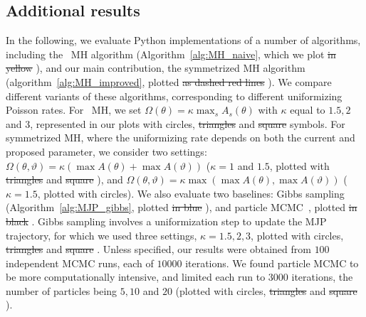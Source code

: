 \subsection{Additional results}
In the following, we evaluate Python implementations of a number of algorithms, including the \naive\ MH algorithm (Algorithm~\ref{alg:MH_naive}, which we plot \sout{in yellow} ), and our main contribution, the symmetrized MH algorithm (algorithm~\ref{alg:MH_improved}, plotted \sout{as dashed red lines}
). 
We compare different variants of these algorithms, corresponding to different uniformizing Poisson rates. %
For \naive\ MH, we set $\Omega(\theta) = \kappa \max_s A_s(\theta) $ with $\kappa$  equal to $1.5, 2$ and $3$, represented in our plots with circles, \sout{triangles}  and \sout{square}  symbols. 
For symmetrized MH, where the uniformizing rate depends on both the current and proposed parameter, we consider two settings:
 $\Omega(\theta, \vartheta) = \kappa (\max A(\theta) + \max A(\vartheta))$ 
 ($\kappa = 1$ and $1.5$, plotted with \sout{triangles}  and \sout{square} ), and 
$\Omega(\theta, \vartheta) = \kappa \max(\max A(\theta), \max A(\vartheta))$
($\kappa=1.5$, plotted with {circles}).  
We also evaluate two baselines: Gibbs sampling (Algorithm~\ref{alg:MJP_gibbs}, plotted \sout{in blue}  ), and particle MCMC~\citep{Andrieu10}, plotted \sout{in black} . Gibbs sampling involves a uniformization step to update the MJP trajectory, for which we used three settings, $\kappa=1.5,2,3$, plotted with circles, \sout{triangles}  and \sout{square} .  
Unless specified, our results were obtained from $100$ independent MCMC runs, each of $10000$ iterations.
We found particle MCMC to be more computationally intensive, and limited each run to $3000$ iterations, the number of particles being $5, 10$ and $20$ (plotted with circles, \sout{triangles}  and \sout{square} ). 


